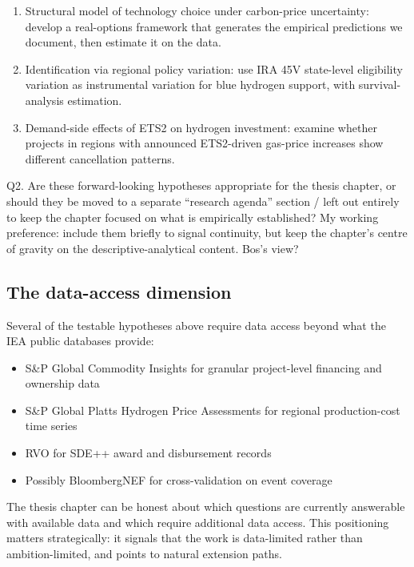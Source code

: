 \documentclass[11pt,a4paper]{article}
\begin{document}
\begin{enumerate}
  \item Structural model of technology choice under carbon-price uncertainty: develop a real-options framework that generates the empirical predictions we document, then estimate it on the data.
  \item Identification via regional policy variation: use IRA 45V state-level eligibility variation as instrumental variation for blue hydrogen support, with survival-analysis estimation.
  \item Demand-side effects of ETS2 on hydrogen investment: examine whether projects in regions with announced ETS2-driven gas-price increases show different cancellation patterns.
\end{enumerate}

\begin{openquestion}
Q2. Are these forward-looking hypotheses appropriate for the thesis chapter, or should they be moved to a separate ``research agenda'' section / left out entirely to keep the chapter focused on what is empirically established? My working preference: include them briefly to signal continuity, but keep the chapter's centre of gravity on the descriptive-analytical content. Bos's view?
\end{openquestion}

\subsection{The data-access dimension}

Several of the testable hypotheses above require data access beyond what the IEA public databases provide:

\begin{itemize}
  \item S\&P Global Commodity Insights for granular project-level financing and ownership data
  \item S\&P Global Platts Hydrogen Price Assessments for regional production-cost time series
  \item RVO for SDE++ award and disbursement records
  \item Possibly BloombergNEF for cross-validation on event coverage
\end{itemize}

The thesis chapter can be honest about which questions are currently answerable with available data and which require additional data access. This positioning matters strategically: it signals that the work is data-limited rather than ambition-limited, and points to natural extension paths.
\end{document}
